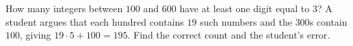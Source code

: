 How many integers between $100$ and $600$ have at least one digit equal to $3$? A student argues that each hundred contains $19$ such numbers and the $300$s contain $100$, giving $19\cdot5+100=195$. Find the correct count and the student's error.
